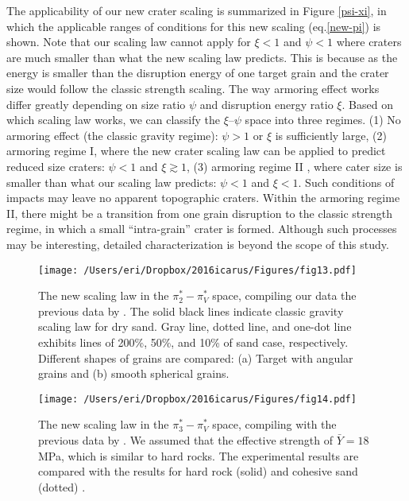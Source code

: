 \documentclass[3p,authoryear]{elsarticle}
\newcommand{\II}{I\hspace{-.1 em}I}
\begin{document}
The applicability of our new crater scaling is summarized in Figure \ref{psi-xi}, in which the applicable ranges of conditions for this new scaling (eq.\eqref{new-pi}) is shown. Note that our scaling law cannot apply for $\xi<1$ and $\psi<1$ where craters are much smaller than what the new scaling law predicts.
This is because as the energy is smaller than the disruption energy of one target grain and the crater size would follow the classic strength scaling.
The way armoring effect works differ greatly depending on size ratio $\psi$ and disruption energy ratio $\xi$.
Based on which scaling law works, we can classify the $\xi$--$\psi$ space into three regimes.
(1) No armoring effect (the classic gravity regime): $\psi>1$ or $\xi$ is sufficiently large, (2) armoring regime I, where the new crater scaling law can be applied to predict reduced size craters: $\psi<1$ and $\xi \gtrsim 1$, (3) armoring regime {\II} , where cater size is smaller than what our scaling law predicts: $\psi<1$ and $\xi<1$.
Such conditions of impacts may leave no apparent topographic craters. Within the armoring regime \II, there might be a transition from one grain disruption to the classic strength regime, in which a small ``intra-grain'' crater is formed. Although such processes may be interesting, detailed characterization is beyond the scope of this study.

\begin{figure*}[tbp]
	\centering
	\texttt{[image: /Users/eri/Dropbox/2016icarus/Figures/fig13.pdf]}
	\caption{The new scaling law in the $\pi_2^*- \pi_V^*$ space, compiling our data the previous data by \citet{schmidt1980, mizutani1983, cintala1999, yamamoto2006, guettler2012, holsapple2014}. The solid black lines indicate classic gravity scaling law for dry sand. Gray line, dotted line, and one-dot line exhibits lines of 200\%, 50\%, and 10\% of sand case, respectively. Different shapes of grains are compared: (a) Target with angular grains and (b) smooth spherical grains.}
	\label{newpi2}
	\centering
\end{figure*}
\begin{figure}[htbp]
	\centering
	\texttt{[image: /Users/eri/Dropbox/2016icarus/Figures/fig14.pdf]}
	\caption{The new scaling law in the $\pi_3^*- \pi_V^*$ space, compiling with the previous data by \citet{schmidt1980, mizutani1983, cintala1999, yamamoto2006, guettler2012, holsapple2014}. We assumed that the effective strength of $\bar{Y}=18$ MPa, which is similar to hard rocks. The experimental results are compared with the results for hard rock (solid) and cohesive sand (dotted) \citep{schmidt1987}.}
	\label{newpi3}
	\centering
\end{figure}
\end{document}
